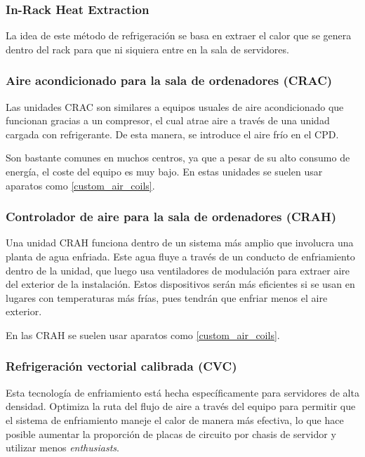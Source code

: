 \subsubsection{In-Rack Heat Extraction}

La idea de este método de refrigeración se basa en extraer el calor que se genera dentro del rack para que ni siquiera entre en la sala de servidores.

\subsubsection{Aire acondicionado para la sala de ordenadores (CRAC)}

Las unidades CRAC son similares a equipos usuales de aire acondicionado que funcionan gracias a un compresor, el cual atrae aire a través de una unidad cargada con refrigerante. De esta manera, se introduce el aire frío en el CPD.

Son bastante comunes en muchos centros, ya que a pesar de su alto consumo de energía, el coste del equipo es muy bajo. En estas unidades se suelen usar aparatos como \eqref{custom_air_coils}.

\subsubsection{Controlador de aire para la sala de ordenadores (CRAH)}

Una unidad CRAH funciona dentro de un sistema más amplio que involucra una planta de agua enfriada. Este agua fluye a través de un conducto de enfriamiento dentro de la unidad, que luego usa ventiladores de modulación para extraer aire del exterior de la instalación. Estos dispositivos serán más eficientes si se usan en lugares con temperaturas más frías, pues tendrán que enfriar menos el aire exterior.

En las CRAH se suelen usar aparatos como \eqref{custom_air_coils}.

\subsubsection{Refrigeración vectorial calibrada (CVC)}

Esta tecnología de enfriamiento está hecha específicamente para servidores de alta densidad. Optimiza la ruta del flujo de aire a través del equipo para permitir que el sistema de enfriamiento maneje el calor de manera más efectiva, lo que hace posible aumentar la proporción de placas de circuito por chasis de servidor y utilizar menos \textit{enthusiasts}.

